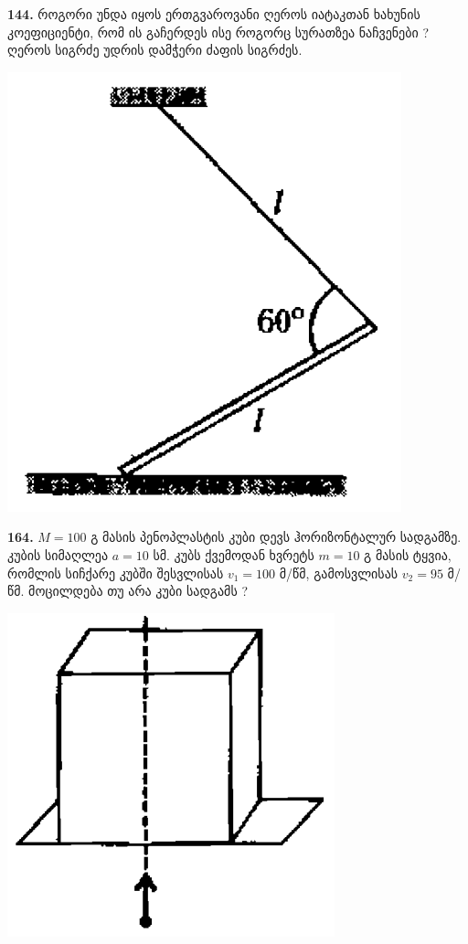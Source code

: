 \documentclass[12pt,a4paper,]{report}
\begin{document}
\textbf{144.} როგორი უნდა იყოს ერთგვაროვანი ღეროს იატაკთან ხახუნის კოეფიციენტი, რომ ის გაჩერდეს ისე როგორც სურათზეა ნაჩვენები ? ღეროს სიგრძე უდრის დამჭერი ძაფის სიგრძეს. 
		\begin{center}
			\includegraphics[scale=0.3]{images/144.png}
		\end{center}

\textbf{164.} $M=100$ გ მასის პენოპლასტის კუბი დევს ჰორიზონტალურ სადგამზე. კუბის სიმაღლეა $a=10$ სმ. კუბს ქვემოდან ხვრეტს $m=10$ გ მასის ტყვია, რომლის სიჩქარე კუბში შესვლისას $v_1=100$ მ/წმ, გამოსვლისას $v_2=95$ მ/წმ. მოცილდება თუ არა კუბი სადგამს ? 
		\begin{center}
			\includegraphics[scale=0.4]{images/164.png}
		\end{center}
	
\end{document}

